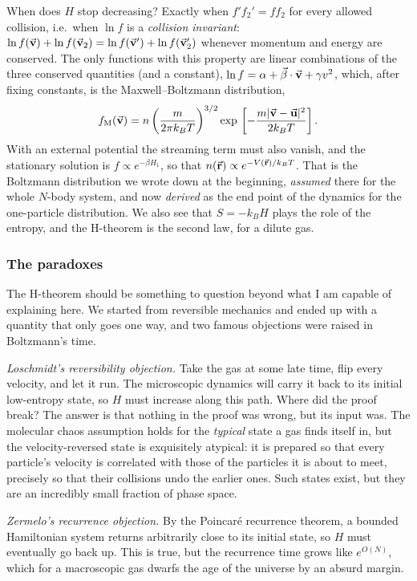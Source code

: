 When does $H$ stop decreasing? Exactly when $f'f_2'=ff_2$ for every allowed collision, i.e.\ when $\ln f$ is a \emph{collision invariant}: $\ln f(\va v)+\ln f(\va v_2)=\ln f(\va v')+\ln f(\va v_2')$ whenever momentum and energy are conserved. The only functions with this property are linear combinations of the three conserved quantities (and a constant), $\ln f=\alpha+\va\beta\cdot\va v+\gamma v^2$, which, after fixing constants, is the Maxwell--Boltzmann distribution,
\[
f_{\mathrm{M}}(\va v)=n\left(\frac{m}{2\pi k_BT}\right)^{3/2}\exp \, \left[-\frac{m|\va v-\va u|^2}{2k_BT}\right].
\]
With an external potential the streaming term must also vanish, and the stationary solution is $f\propto e^{-\beta H_1}$, so that $n(\va r)\propto e^{-V(\va r)/k_BT}$. That is the Boltzmann distribution we wrote down at the beginning, \emph{assumed} there for the whole $N$-body system, and now \emph{derived} as the end point of the dynamics for the one-particle distribution. We also see that $S=-k_BH$ plays the role of the entropy, and the H-theorem is the second law, for a dilute gas.

\subsubsection*{The paradoxes}

The H-theorem should be something to question beyond what I am capable of explaining here. We started from reversible mechanics and ended up with a quantity that only goes one way, and two famous objections were raised in Boltzmann's time.

\emph{Loschmidt's reversibility objection.} Take the gas at some late time, flip every velocity, and let it run. The microscopic dynamics will carry it back to its initial low-entropy state, so $H$ must increase along this path. Where did the proof break? The answer is that nothing in the proof was wrong, but its input was. The molecular chaos assumption holds for the \emph{typical} state a gas finds itself in, but the velocity-reversed state is exquisitely atypical: it is prepared so that every particle's velocity is correlated with those of the particles it is about to meet, precisely so that their collisions undo the earlier ones. Such states exist, but they are an incredibly small fraction of phase space.

\emph{Zermelo's recurrence objection.} By the Poincar\'e recurrence theorem, a bounded Hamiltonian system returns arbitrarily close to its initial state, so $H$ must eventually go back up. This is true, but the recurrence time grows like $e^{O(N)}$, which for a macroscopic gas dwarfs the age of the universe by an absurd margin.

